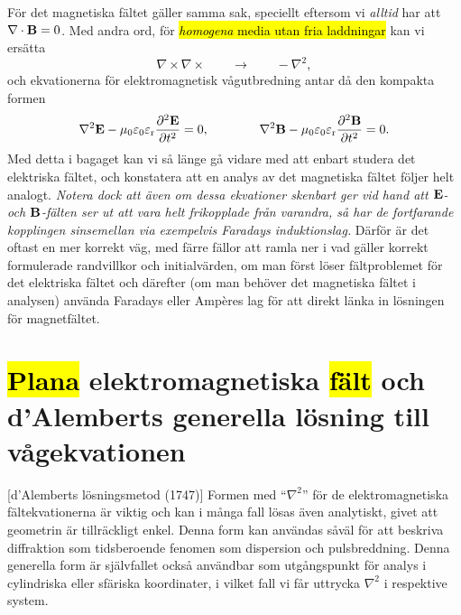 F{\"o}r det magnetiska f{\"a}ltet g{\"a}ller samma sak, speciellt eftersom vi
{\it alltid} har att $\nabla\cdot{\bf B}=0$. Med andra ord, f{\"o}r
{\hl{{\it homogena} media utan fria laddningar}} kan vi ers{\"a}tta
\hl{$$
  \nabla\times\nabla\times\qquad\to\qquad-\nabla^2,
$$}
och ekvationerna f{\"o}r elektromagnetisk v{\aa}gutbredning antar d{\aa} den
kompakta formen
\hl{$$
  \nabla^2{\bf E} - \mu_0\varepsilon_0\varepsilon_{\rm r}
    {{\partial^2{\bf E}}\over{\partial t^2}} = 0,
  \qquad\qquad
  \nabla^2{\bf B} - \mu_0\varepsilon_0\varepsilon_{\rm r}
    {{\partial^2{\bf B}}\over{\partial t^2}} = 0.
$$}
Med detta i bagaget kan vi s{\aa} l{\"a}nge g{\aa} vidare med att enbart
studera det elektriska f{\"a}ltet, och konstatera att en analys av det
magnetiska f{\"a}ltet f{\"o}ljer helt analogt. {\it Notera dock att {\"a}ven om
dessa ekvationer skenbart ger vid hand att ${\bf E}$- och ${\bf B}$-f{\"a}lten
ser ut att vara helt frikopplade fr{\aa}n varandra, s{\aa} har de fortfarande
kopplingen sinsemellan via exempelvis Faradays induktionslag.} D{\"a}rf{\"o}r
{\"a}r det oftast en mer korrekt v{\"a}g, med f{\"a}rre f{\"a}llor att ramla
ner i vad g{\"a}ller korrekt formulerade randvillkor och initialv{\"a}rden,
om man f{\"o}rst l{\"o}ser f{\"a}ltproblemet f{\"o}r det elektriska f{\"a}ltet
och d{\"a}refter (om man beh{\"o}ver det magnetiska f{\"a}ltet i analysen)
anv{\"a}nda Faradays eller Amp\`eres lag f{\"o}r att direkt l{\"a}nka in
l{\"o}sningen f{\"o}r magnetf{\"a}ltet.

\section{{\hl{Plana}} elektromagnetiska {\hl{f{\"a}lt}} och d'Alemberts
  generella l{\"o}sning till v{\aa}gekvationen}
[d'Alemberts l{\"o}sningsmetod
  (1747)]
Formen med ``$\nabla^2$'' f{\"o}r de elektromagnetiska f{\"a}ltekvationerna
{\"a}r viktig och kan i m{\aa}nga fall l{\"o}sas {\"a}ven analytiskt, givet
att geometrin {\"a}r tillr{\"a}ckligt enkel. Denna form kan anv{\"a}ndas
s{\aa}v{\"a}l f{\"o}r att beskriva diffraktion som tidsberoende fenomen som
dispersion och pulsbreddning. Denna generella form {\"a}r sj{\"a}lvfallet
ocks{\aa} anv{\"a}ndbar som utg{\aa}ngspunkt f{\"o}r analys i cylindriska
eller sf{\"a}riska koordinater, i vilket fall vi f{\aa}r uttrycka $\nabla^2$
i respektive system.

